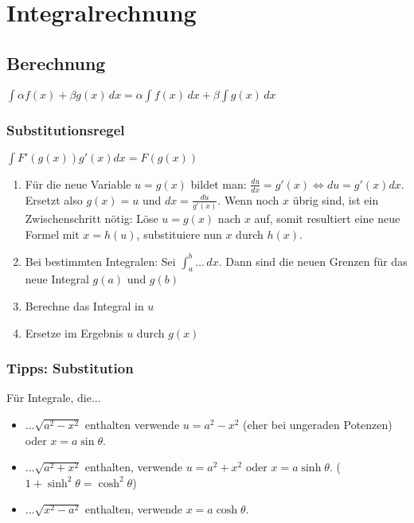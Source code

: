 \section{Integralrechnung}


\subsection{Berechnung}
$\int \alpha f(x) + \beta g(x)\,dx = \alpha \int f(x)\,dx + \beta \int g(x)\,dx$

\subsubsection{Substitutionsregel}
$\int F'(g(x)) g'(x)dx = F(g(x))$


\begin{enumerate}
	\item Für die neue Variable $u = g(x)$ bildet man: $\frac{du}{dx} = g'(x)
	\Leftrightarrow du = g'(x)dx$. Ersetzt also $g(x) = u$ und $dx =
	\frac{du}{g'(x)}$. Wenn noch $x$ übrig sind, ist ein Zwischenschritt nötig:
	Löse $u = g(x)$ nach $x$ auf, somit resultiert eine neue Formel mit 
	$x = h(u)$, substituiere nun $x$ durch $h(x)$.
	\item Bei bestimmten Integralen: Sei $\int_a^b \ldots \,dx$. Dann sind die neuen
	Grenzen für das neue Integral $g(a)$ und $g(b)$
	\item Berechne das Integral in $u$
	\item Ersetze im Ergebnis $u$ durch $g(x)$
\end{enumerate}

\subsubsection{Tipps: Substitution}
Für Integrale, die...
\begin{itemize}
	\item ...$\sqrt{a^2-x^2}$ enthalten verwende $u = a^2 - x^2$ (eher bei ungeraden
		Potenzen) oder $x=a \sin\theta$.
	\item ...$\sqrt{a^2 + x^2}$ enthalten, verwende $u = a^2 + x^2$ oder 
		$x = a \sinh \theta$. ($1 + \sinh^2\theta = \cosh^2\theta$)
	\item ...$\sqrt{x^2-a^2}$ enthalten, verwende $x = a \cosh\theta$.
\end{itemize}

